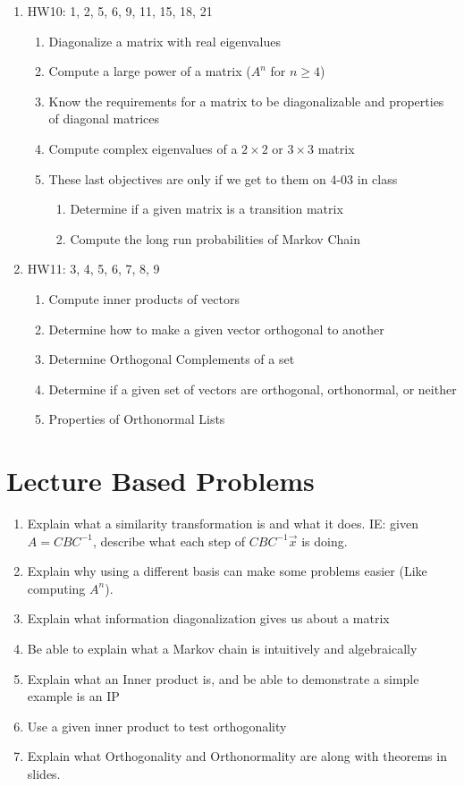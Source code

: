 \documentclass[12pt]{exam}
\begin{document}
\begin{enumerate}
\begin{enumerate}
        \end{enumerate}
    \item HW10: 1, 2, 5, 6, 9, 11, 15, 18, 21
        \begin{enumerate}
            \item Diagonalize a matrix with real eigenvalues
            \item Compute a large power of a matrix ($A^n$ for $n\geq 4$)
            \item Know the requirements for a matrix to be diagonalizable and properties of diagonal matrices
            \item Compute complex eigenvalues of a $2\times 2$ or $3\times 3$ matrix
            \item These last objectives are only if we get to them on 4-03 in class
                \begin{enumerate}
                    \item Determine if a given matrix is a transition matrix
                    \item Compute the long run probabilities of Markov Chain
                \end{enumerate}
        \end{enumerate}
    \item HW11:  3, 4, 5, 6, 7, 8, 9
        \begin{enumerate}
            \item Compute inner products of vectors
            \item Determine how to make a given vector orthogonal to another
            \item Determine Orthogonal Complements of a set
            \item Determine if a given set of vectors are orthogonal, orthonormal, or neither
            \item Properties of Orthonormal Lists
        \end{enumerate}
\end{enumerate}
\section{Lecture Based Problems}
\begin{enumerate}
    \item Explain what a similarity transformation is and what it does. IE: given $A = CBC^{-1}$, describe
        what each step of $CBC^{-1}\vec{x}$ is doing.
    \item Explain why using a different basis can make some problems easier (Like computing $A^n$).
    \item Explain what information diagonalization gives us about a matrix
    \item Be able to explain what a Markov chain is intuitively and algebraically
    \item Explain what an Inner product is, and be able to demonstrate a simple example is an IP
    \item Use a given inner product to test orthogonality
    \item Explain what Orthogonality and Orthonormality are along with theorems in slides.
\end{enumerate}
\end{document}
